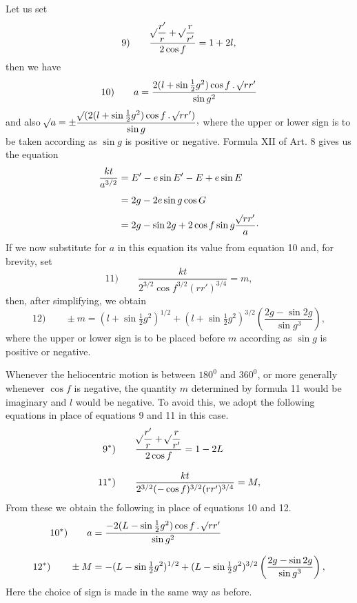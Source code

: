 Let us set
\[
\mathrm{9)}\qquad\frac{\mathord{{}^{}\!\surd}\dfrac{r'}r+\mathord{{}^{}\!\surd}\dfrac{r}{r'}}{2\cos f}=1+2l,
\]
then we have
\[
\mathrm{10)}\qquad a=\frac{2(l+\sin\tfrac12g^2)\cos f\mathbin{.}\mathord{{}^{}\!\surd}rr'}{\sin g^2}
\]
and also $\BareRoot{a}=\pm\dfrac{\BareRoot{(2(l+\sin\tfrac12g^2)\cos f\mathbin{.}\BareRoot{rr'})}}{\sin g}\mathpunct{\raisebox{.45ex}{,}}$ where the upper or lower sign is to be taken according as $\sin g$ is positive or negative. Formula XII of Art. 8 gives us the equation
\[
\begin{aligned}
\frac{kt}{a^{3/2}}&=E'-e\sin E'-E+e\sin E\\[4pt]
&=2g-2e\sin g\cos G\\[4pt]
&=2g-\sin2g+2\cos f\sin g\frac{\mathord{{}^{}\!\surd}rr'}a\mathpunct{\cdot}
\end{aligned}
\]
If we now substitute for $a$ in this equation its value from equation 10 and, for brevity, set
\[
\mathrm{11)}\qquad\frac{kt}{2^{3/2}\cos f^{3/2}(rr')^{3/4}}=m,
\]
then, after simplifying, we obtain
\[
\mathrm{12)}\qquad\pm m=(l+\sin\tfrac12g^2)^{1/2}+(l+\sin\tfrac12g^2)^{3/2}\left(\frac{2g-\sin2g}{\sin g^3}\right),
\]
where the upper or lower sign is to be placed before $m$ according as $\sin g$ is positive or negative.

Whenever the heliocentric motion is between $180^0$ and $360^0$, or more generally whenever $\cos f$ is negative, the quantity $m$ determined by formula 11 would be imaginary and $l$ would be negative. To avoid this, we adopt the following equations in place of equations 9 and 11 in this case.
\[
\begin{aligned}
\mathrm{9^*)}\qquad&\frac{\mathord{{}^{}\!\surd}\dfrac{r'}r+\mathord{{}^{}\!\surd}\dfrac{r}{r'}}{2\cos f}=1-2L\\[8pt]
\mathrm{11^*)}\qquad&\frac{kt}{2^{3/2}(-\cos f)^{3/2}(rr')^{3/4}}=M,
\end{aligned}
\]
From these we obtain the following in place of equations 10 and 12.
\[
\begin{aligned}
\mathrm{10^*)}\qquad a&=\frac{-2(L-\sin\tfrac12g^2)\cos f\mathbin{.}\mathord{{}^{}\!\surd}rr'}{\sin g^2}\\[8pt]
\mathrm{12^*)}\qquad\pm M&=-(L-\sin\tfrac12g^2)^{1/2}+(L-\sin\tfrac12g^2)^{3/2}\left(\frac{2g-\sin2g}{\sin g^3}\right),
\end{aligned}
\]
Here the choice of sign is made in the same way as before.
